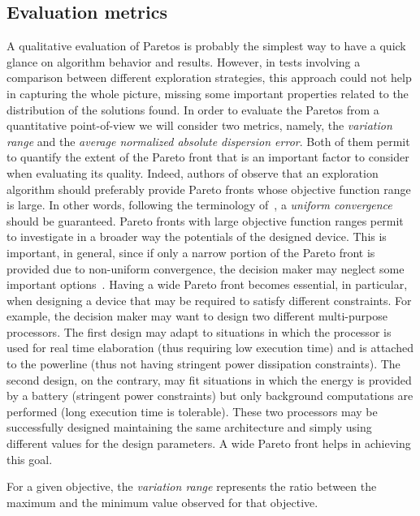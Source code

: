 \subsection{Evaluation metrics}
A qualitative evaluation of Paretos is probably the simplest way to
have a quick glance on algorithm behavior and results. However, in
tests involving a comparison between different exploration strategies,
this approach could not help in capturing the whole picture, missing
some important properties related to the distribution of the solutions
found.
In order to evaluate the Paretos from a quantitative point-of-view we
will consider two metrics, namely, the \emph{variation range} and the
\emph{average normalized absolute dispersion error}. Both of them permit to quantify the extent of the Pareto front that is an important factor to consider when evaluating its quality. Indeed, authors of \cite{zitzler_ec00,weise2012evolutionary} observe that an exploration algorithm should preferably provide Pareto fronts whose objective function range is large. In other words, following the terminology of~\cite{weise2012evolutionary}, a \emph{uniform convergence} should be guaranteed.
Pareto fronts with large objective function ranges permit to investigate in a broader way the potentials of the designed device. This is important, in general, since if only a narrow portion of the Pareto front is provided due to non-uniform convergence, the decision maker may neglect some important options~\cite{weise2012evolutionary}. Having a wide Pareto front becomes essential, in particular, when designing a device that may be required to satisfy different constraints. For example, the decision maker may want to design two different multi-purpose processors. The first design may adapt to situations in which the processor is used for real time elaboration (thus requiring low execution time) and is attached to the powerline (thus not having stringent power dissipation constraints). The second design, on the contrary, may fit situations in which the energy is provided by a battery (stringent power constraints) but only background computations are performed (long execution time is tolerable). These two processors may be successfully designed maintaining the same architecture and simply using different values for the design parameters. A wide Pareto front helps in achieving this goal.

For a given objective, the \emph{variation range} represents the ratio
between the maximum and the minimum value observed for that objective.

